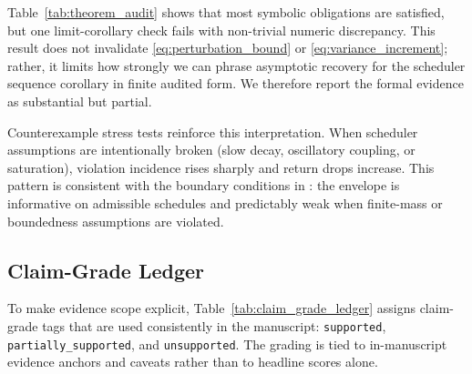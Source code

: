 \documentclass{article} %
\begin{document}
Table~\ref{tab:theorem_audit} shows that most symbolic obligations are satisfied, but one limit-corollary check fails with non-trivial numeric discrepancy. This result does not invalidate \eqref{eq:perturbation_bound} or \eqref{eq:variance_increment}; rather, it limits how strongly we can phrase asymptotic recovery for the scheduler sequence corollary in finite audited form. We therefore report the formal evidence as substantial but partial.

Counterexample stress tests reinforce this interpretation. When scheduler assumptions are intentionally broken (slow decay, oscillatory coupling, or saturation), violation incidence rises sharply and return drops increase. This pattern is consistent with the boundary conditions in : the envelope is informative on admissible schedules and predictably weak when finite-mass or boundedness assumptions are violated.

\subsection{Claim-Grade Ledger}

To make evidence scope explicit, Table~\ref{tab:claim_grade_ledger} assigns claim-grade tags that are used consistently in the manuscript: \texttt{supported}, \texttt{partially\_supported}, and \texttt{unsupported}. The grading is tied to in-manuscript evidence anchors and caveats rather than to headline scores alone.
\end{document}
